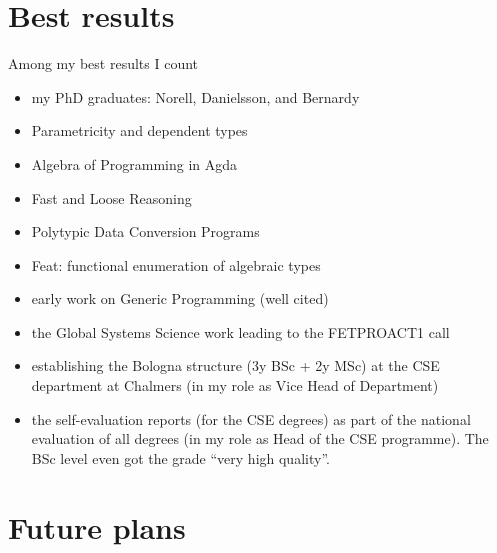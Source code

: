 \section{Best results}
Among my best results I count
\begin{itemize}
\item my PhD graduates: Norell, Danielsson, and Bernardy
\item Parametricity and dependent types \citep{bernardy_parametricity_2010}
\item Algebra of Programming in Agda \citep{MuKoJansson2009AoPA}
\item Fast and Loose Reasoning \citep{danielssonetal06:fastandloose}
\item Polytypic Data Conversion Programs \citep{janssonjeuring-dataconv}
\item Feat: functional enumeration of algebraic types \citep{duregardHaskell12Feat}
\item early work on Generic Programming \citep{backhouseetal98, janssonjeuring1997a} (well cited)
\item the Global Systems Science work \cite{jaeger13:GSSshort} leading to the FETPROACT1 call
\item establishing the Bologna structure (3y BSc + 2y MSc) at the CSE
  department at Chalmers (in my role as Vice Head of Department)
\item the self-evaluation reports (for the CSE degrees) as part of the
  national evaluation of all degrees (in my role as Head of the CSE
  programme). The BSc level even got the grade ``very high quality''.
\end{itemize}

\section{Future plans}

